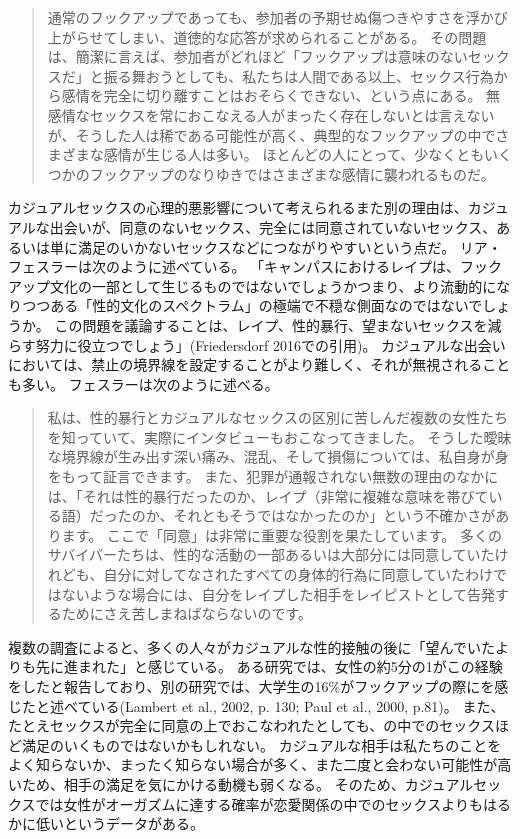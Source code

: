 \documentclass[paper=a4,book,openany]{jlreq} \usepackage{mystyle}
\begin{document}
\begin{quote}
 通常のフックアップであっても、参加者の予期せぬ傷つきやすさを浮かび上がらせてしまい、道徳的な応答が求められることがある。
その問題は、簡潔に言えば、参加者がどれほど「フックアップは意味のないセックスだ」と振る舞おうとしても、私たちは人間である以上、セックス行為から感情を完全に切り離すことはおそらくできない、という点にある。
無感情なセックスを常におこなえる人がまったく存在しないとは言えないが、そうした人は稀である可能性が高く、典型的なフックアップの中でさまざまな感情が生じる人は多い。
ほとんどの人にとって、少なくともいくつかのフックアップのなりゆきではさまざまな感情に襲われるものだ。
\citep[Chapter 7]{rocha19}
\end{quote}

カジュアルセックスの心理的悪影響について考えられるまた別の理由は、カジュアルな出会いが、同意のないセックス、完全には同意されていないセックス、あるいは単に満足のいかないセックスなどにつながりやすいという点だ。
リア・フェスラーは次のように述べている。
「キャンパスにおけるレイプは、フックアップ文化の一部として生じるものではないでしょうか{\DDASH}つまり、より流動的になりつつある「性的文化のスペクトラム」の極端で不穏な側面なのではないでしょうか。
この問題を議論することは、レイプ、性的暴行、望まないセックスを減らす努力に役立つでしょう」(Friedersdorf 2016での引用)\nocite{friedersdorf16:_how_does_hook}。
カジュアルな出会いにおいては、禁止の境界線を設定することがより難しく、それが無視されることも多い。
フェスラーは次のように述べる。

\begin{quote}
 私は、性的暴行とカジュアルなセックスの区別に苦しんだ複数の女性たちを知っていて、実際にインタビューもおこなってきました。
そうした曖昧な境界線が生み出す深い痛み、混乱、そして損傷については、私自身が身をもって証言できます。
また、犯罪が通報されない無数の理由のなかには、「それは性的暴行だったのか、レイプ（非常に複雑な意味を帯びている語）だったのか、それともそうではなかったのか」という不確かさがあります。
ここで「同意」は非常に重要な役割を果たしています。
多くのサバイバーたちは、性的な活動の一部あるいは大部分には同意していたけれども、自分に対してなされたすべての身体的行為に同意していたわけではないような場合には、自分をレイプした相手をレイピストとして告発するためにさえ苦しまねばならないのです。
\citep{friedersdorf16:_how_does_hook}
\end{quote}

複数の調査によると、多くの人々がカジュアルな性的接触の後に「望んでいたよりも先に進まれた」と感じている。
ある研究では、女性の約5分の1がこの経験をしたと報告しており、別の研究では、大学生の16\%がフックアップの際にを感じたと述べている(Lambert et al., 2002, p. 130; Paul et al., 2000, p.81)。
\nocite{lambert02:_plur_ignor_hook_up}\nocite{paul00:_hook}
また、たとえセックスが完全に同意の上でおこなわれたとしても、の中でのセックスほど満足のいくものではないかもしれない。
カジュアルな相手は私たちのことをよく知らないか、まったく知らない場合が多く、また二度と会わない可能性が高いため、相手の満足を気にかける動機も弱くなる。
そのため、カジュアルセックスでは女性がオーガズムに達する確率が恋愛関係の中でのセックスよりもはるかに低いというデータがある\citep{armstrong10:_orgas_coll_hook_relat}。
\end{document}
